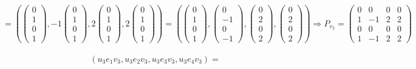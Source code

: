 \documentclass{article}
\begin{document}
$$= \left(\begin{pmatrix}0 \\ 1 \\ 0 \\ 1\end{pmatrix}, -1\begin{pmatrix}0 \\ 1 \\ 0 \\ 1\end{pmatrix}, 2\begin{pmatrix}0 \\ 1 \\ 0 \\ 1\end{pmatrix}, 2\begin{pmatrix}0 \\ 1 \\ 0 \\ 1\end{pmatrix}\right) = \left(\begin{pmatrix}0 \\ 1 \\ 0 \\ 1\end{pmatrix}, \begin{pmatrix}0 \\ -1 \\ 0 \\- 1\end{pmatrix}, \begin{pmatrix}0 \\ 2 \\ 0 \\ 2\end{pmatrix}, \begin{pmatrix}0 \\ 2 \\ 0 \\ 2\end{pmatrix}\right) \Rightarrow P_{v_2} = \begin{pmatrix}
0 & 0 & 0 & 0 \\
1 & -1 & 2 & 2 \\
0 & 0 & 0 & 0 \\
1 & -1 & 2 & 2 
\end{pmatrix} $$ \\
$$\left(u_3e_1v_3, u_3e_2v_3, u_3e_3v_3, u_3e_4v_3\right) =$$
\end{document}
